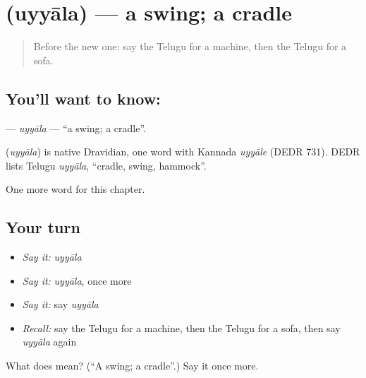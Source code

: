 \section[\texorpdfstring{\te{ఉయ్యాల} (uyyāla)}{ఉయ్యాల (uyyāla)}]{ (uyyāla) — a swing; a cradle}

\label{lesson:TE-C190-uyyala}



\begin{quote}
Before the new one: say the Telugu for a machine, then the Telugu for a sofa.
\end{quote}

\subsection*{You'll want to know: }
\textbf{} — \emph{uyyāla} — \textquotedblleft{}a swing; a cradle\textquotedblright{}.

\begin{cousinweb}
\textbf{} (\emph{uyyāla}) is native Dravidian, one word with Kannada \emph{uyyāle} (DEDR 731). DEDR lists Telugu \emph{uyyāla}, \textquotedblleft{}cradle, swing, hammock\textquotedblright{}.
\end{cousinweb}

\begin{grammarlens}[title={What you've built}]
One more word for this chapter.
\end{grammarlens}

\subsection*{Your turn}
\begin{itemize}
\raggedright
  \item \emph{Say it:} \emph{uyyāla}
  \item \emph{Say it:} \emph{uyyāla}, once more
  \item \emph{Say it:} say \emph{uyyāla}
  \item \emph{Recall:} say the Telugu for a machine, then the Telugu for a sofa, then say \emph{uyyāla} again
\end{itemize}

\begin{tcolorbox}[breakable,colback=teal!4,colframe=teal!35!black,title={Before you move on}]
What does  mean? (\textquotedblleft{}A swing; a cradle\textquotedblright{}.) Say it once more.
\end{tcolorbox}
